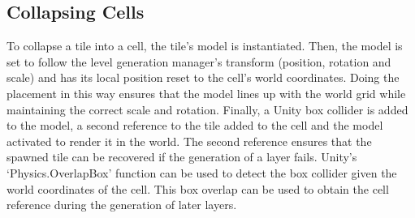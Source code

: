 
\subsection{Collapsing Cells}\label{sec:collapsingCells}
To collapse a tile into a cell, the tile's model is instantiated. Then, the model is set to follow the level generation manager's transform (position, rotation and scale) and has its local position reset to the cell's world coordinates. Doing the placement in this way ensures that the model lines up with the world grid while maintaining the correct scale and rotation. Finally, a Unity box collider is added to the model, a second reference to the tile added to the cell and the model activated to render it in the world. The second reference ensures that the spawned tile can be recovered if the generation of a layer fails. Unity's `Physics.OverlapBox' function can be used to detect the box collider given the world coordinates of the cell. This box overlap can be used to obtain the cell reference during the generation of later layers.


